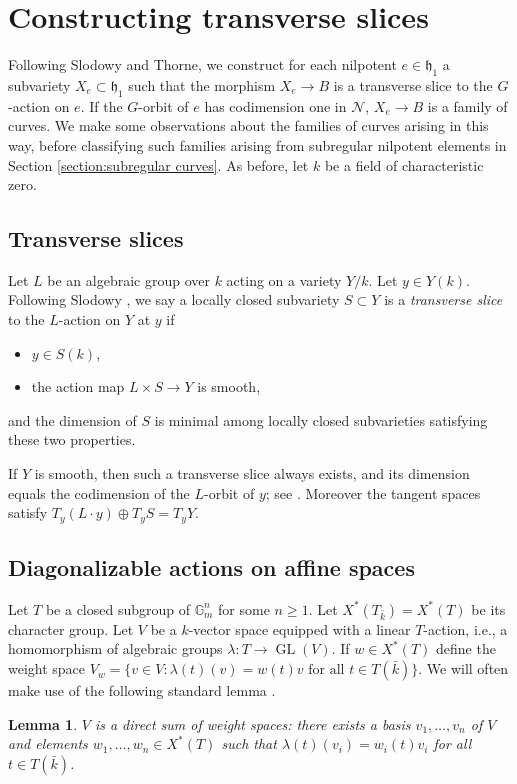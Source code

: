\documentclass{article} %
\newtheorem{lemma}[proposition]{Lemma}
\numberwithin{equation}{section}
\theoremstyle{definition}
\newcommand{\G}{\mathbb{G}}
\DeclareMathOperator{\GL}{GL}
\newcommand{\frakh}{\mathfrak h}
\begin{document}
\section{Constructing transverse slices}\label{section: constructing families of curves}

Following Slodowy and Thorne, we construct for each nilpotent $e\in \frakh_1$ a subvariety $X_e\subset \frakh_1$ such that the morphism $X_e\rightarrow B$ is a transverse slice to the $G$-action on $e$.
If the $G$-orbit of $e$ has codimension one in $\mathcal{N}$, $X_e\rightarrow B$ is a family of curves.
We make some observations about the families of curves arising in this way, before classifying such families arising from subregular nilpotent elements in Section \ref{section:subregular curves}. 
As before, let $k$ be a field of characteristic zero.


\subsection{Transverse slices}

Let $L$ be an algebraic group over $k$ acting on a variety $Y/k$.
Let $y\in Y(k)$.
Following Slodowy \cite[\S5.1]{Slodowy-simplesingularitiesalggroups}, we say a locally closed subvariety $S\subset Y$ is a \textit{transverse slice} to the $L$-action on $Y$ at $y$ if 
\begin{itemize}
    \item $y\in S(k)$,
    \item the action map $L\times S\rightarrow Y$ is smooth,
\end{itemize}
and the dimension of $S$ is minimal among locally closed subvarieties satisfying these two properties.

If $Y$ is smooth, then such a transverse slice always exists, and its dimension equals the codimension of the $L$-orbit of $y$; see \cite[Lemma 1 and Remark 2]{Slodowy-simplesingularitiesalggroups}.
Moreover the tangent spaces satisfy $T_y(L\cdot y) \oplus T_y S = T_yY$.

\subsection{Diagonalizable actions on affine spaces}\label{subsec: diagonalizable actions}

Let $T$ be a closed subgroup of $\G_m^n$ for some $n\geq 1$. 
Let $X^*(T_{\bar{k}}) = X^*(T)$ be its character group.
Let $V$ be a $k$-vector space equipped with a linear $T$-action, i.e., a homomorphism of algebraic groups $\lambda\colon T\rightarrow \GL(V)$.
If $w\in X^*(T)$ define the weight space $V_w = \{v\in V\colon \lambda(t)(v) = w(t)v \text{ for all }t\in T(\bar{k})\}$.
We will often make use of the following standard lemma \cite[Chapter 3, Section 8.4]{Borel-linearalgebraicgroups}.
\begin{lemma}\label{lemma: representations diagonalizable groups}
    $V$ is a direct sum of weight spaces: there exists a basis $v_1,\dots,v_n$ of $V$ and elements $w_1, \dots, w_n \in X^*(T)$ such that $\lambda(t)(v_i) = w_i(t) v_i$ for all $t\in T(\bar{k})$.
\end{lemma}
\end{document}
